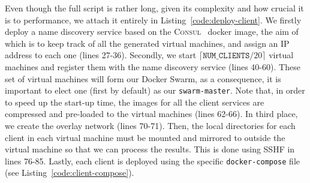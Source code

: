 Even though the full script is rather long, given its complexity and how crucial it is to \projName performance, we attach it entirely in Listing~\ref{code:deploy-client}.
We firstly deploy a name discovery service based on the \textsc{Consul}~\cite{consul-image} docker image, the aim of which is to keep track of all the generated virtual machines, and assign an IP address to each one (lines 27-36).
Secondly, we start $\lceil \texttt{NUM\_CLIENTS} / 20 \rceil$ virtual machines and register them with the name discovery service (lines 40-60).
These set of virtual machines will form our Docker Swarm, as a consequence, it is important to elect one (first by default) as our \texttt{swarm-master}.
Note that, in order to speed up the start-up time, the images for all the client services are compressed and pre-loaded to the virtual machines (lines 62-66).
In third place, we create the overlay network (lines 70-71).
Then, the local directories for each client in each virtual machine must be mounted and mirrored to outside the virtual machine so that we can process the results.
This is done using SSHF in lines 76-85.
Lastly, each client is deployed using the specific \texttt{docker-compose} file (see Listing~\ref{code:client-compose}).
